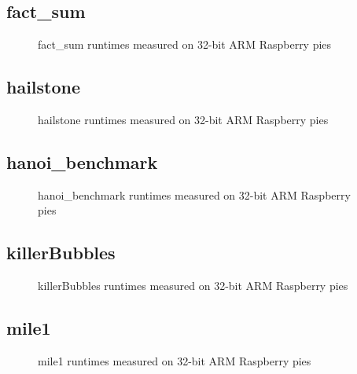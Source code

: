 \newpage
\subsection{fact\_sum}
    
    \begin{figure}[h]
	    \centering
		
        \caption{fact\_sum runtimes measured on 32-bit ARM Raspberry pies}
	\end{figure}
    


\newpage
\subsection{hailstone}
    
    \begin{figure}[h]
	    \centering
		
        \caption{hailstone runtimes measured on 32-bit ARM Raspberry pies}
	\end{figure}
    


\newpage
\subsection{hanoi\_benchmark}
    
    \begin{figure}[h]
	    \centering
		
        \caption{hanoi\_benchmark runtimes measured on 32-bit ARM Raspberry pies}
	\end{figure}
    


\newpage
\subsection{killerBubbles}
    
    \begin{figure}[h]
	    \centering
		
        \caption{killerBubbles runtimes measured on 32-bit ARM Raspberry pies}
	\end{figure}
    


\newpage
\subsection{mile1}
    
    \begin{figure}[h]
	    \centering
		
        \caption{mile1 runtimes measured on 32-bit ARM Raspberry pies}
	\end{figure}
    



